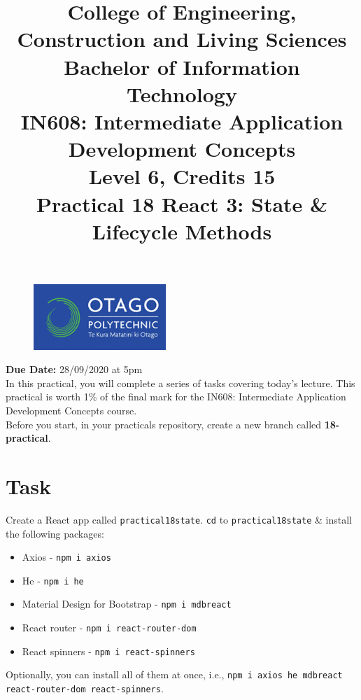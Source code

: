 \documentclass{article}
\author{}
\begin{document}
\begin{figure}
	\centering
	\includegraphics[width=50mm]{./img/logo.png}
\end{figure}

\title{College of Engineering, Construction and Living Sciences\\Bachelor of Information Technology\\IN608: Intermediate Application Development Concepts\\Level 6, Credits 15\\\textbf{Practical 18 React 3: State \& Lifecycle Methods}} 
\date{}
\maketitle

\textbf{Due Date:} 28/09/2020 at 5pm \\

In this practical, you will complete a series of tasks covering today's lecture. This practical is worth 1\% of the final mark for the IN608: Intermediate Application Development Concepts course. \\

Before you start, in your practicals repository, create a new branch called \textbf{18-practical}.

\section*{Task} 
Create a React app called \texttt{practical18state}. \texttt{cd} to \texttt{practical18state} \& install the following packages:
\begin{itemize}
  \item Axios - \texttt{npm i axios}
  \item He - \texttt{npm i he}
  \item Material Design for Bootstrap - \texttt{npm i mdbreact}
  \item React router - \texttt{npm i react-router-dom}
  \item React spinners - \texttt{npm i react-spinners}
\end{itemize}

Optionally, you can install all of them at once, i.e., \texttt{npm i axios he mdbreact react-router-dom react-spinners}. \\
\end{document}
